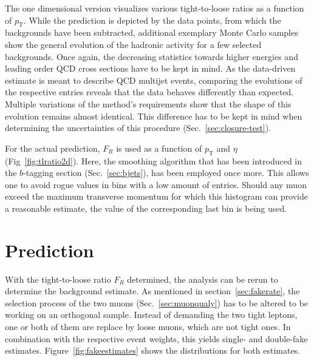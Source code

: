 The one dimensional version visualizes various tight-to-loose ratios as a function of $p_{\text{T}}$. While the prediction is depicted by the data points, from which the backgrounds have been subtracted, additional exemplary Monte Carlo samples show the general evolution of the hadronic activity for a few selected backgrounds. Once again, the decreasing statistics towards higher energies and leading order QCD cross sections have to be kept in mind. As the data-driven estimate is meant to describe QCD multijet events, comparing the evolutions of the respective entries reveals that the data behaves differently than expected. Multiple variations of the method's requirements show that the shape of this evolution remains almost identical. This difference has to be kept in mind when determining the uncertainties of this procedure (Sec.~\ref{sec:closure-test}).  

For the actual prediction, $F_R$ is used as a function of $p_{\text{T}}$ and $\eta$ (Fig~\ref{fig:tlratio2d}). Here, the smoothing algorithm that has been introduced in the $b$-tagging section (Sec.~\ref{sec:bjets}), has been employed once more. This allows one to avoid rogue values in bins with a low amount of entries. Should any muon exceed the maximum transverse momentum for which this histogram can provide a reasonable estimate, the value of the corresponding last bin is being used.

\section{Prediction}
\label{sec:tlprediction}

With the tight-to-loose ratio $F_R$ determined, the analysis can be rerun to determine the background estimate. As mentioned in section~\ref{sec:fakerate}, the selection process of the two muons (Sec.~\ref{sec:muonqualy}) has to be altered to be working on an orthogonal sample. Instead of demanding the two tight leptons, one or both of them are replace by loose muons, which are not tight ones. In combination with the respective event weights, this yields single- and double-fake estimates. Figure~\ref{fig:fakeestimates} shows the distributions for both estimates.

